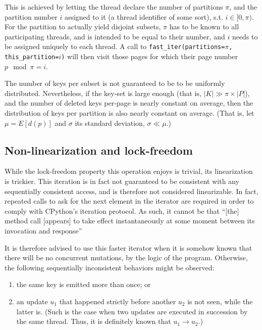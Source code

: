 This is achieved by letting the thread declare the number of partitions $\pi$, and the partition number $i$ assigned to it (a thread identifier of some sort), s.t. $i \in [0, \pi)$.
For the partition to actually yield disjoint subsets, $\pi$ has to be known to all participating threads, and is intended to be equal to their number, and $i$ needs to be assigned uniquely to each thread.
A call to \texttt{{fast\_iter(partitions=$\pi$, this\_partition=$i$)}} will then visit those pages for which their page number $p \mod \pi = i$.

The number of keys per subset is not guaranteed to be to be uniformly distributed.
Nevertheless, if the key-set is large enough (that is, $|K| \gg \pi \times |P|$), and the number of deleted keys per-page is nearly constant on average, then the distribution of keys per partition is also nearly constant on average.
(That is, let $\mu = E[d(p)]$ and $\sigma$ its standard deviation, $\sigma \ll \mu$.)

\subsection{Non-linearization and lock-freedom}\label{subsec:iteration-linearization-lock-freedom}
While the lock-freedom property this operation enjoys is trivial, its linearization is trickier.
This iteration is in fact not guaranteed to be consistent with any sequentially consistent access, and is therefore not considered linearizable.
In fact, repeated calls to ask for the next element in the iterator are required in order to comply with CPython's iteration protocol.
As such, it cannot be that ``[the] method call [appears] to take effect instantaneously at some moment between its invocation and response''~\cite[Principle~3.5.1]{art-mp}

It is therefore advised to use this faster iterator when it is somehow known that there will be no concurrent mutations, by the logic of the program.
Otherwise, the following sequentially inconsistent behaviors might be observed:
\begin{enumerate}
    \item the same key is emitted more than once; or
    \item an update $u_1$ that happened strictly before another $u_2$ is not seen, while the latter is.
    (Such is the case when two updates are executed in succession by the same thread.
    Thus, it is definitely known that $u_1 \rightarrow u_2$.)
\end{enumerate}

